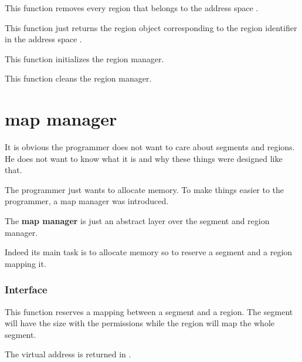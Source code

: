 	 {
	   This function removes every region that belongs to the
	   address space .
	 }

	 {
	   This function just returns the region object
	   corresponding to the region identifier  in the
	   address space .
	 }

	 {
	   This function initializes the region manager.
	 }

	 {
	   This function cleans the region manager.
	 }

%
%

\section{map manager}

It is obvious the programmer does not want to care about segments and
regions. He does not want to know what it is and why these things were
designed like that.

The programmer just wants to allocate memory. To make things easier
to the programmer, a map manager was introduced.

The \textbf{map manager} is just an abstract layer over the segment
and region manager.

Indeed its main task is to allocate memory so to reserve a segment
and a region mapping it.

%
%

\subsubsection{Interface}

	 {
	   This function reserves a mapping between a segment and a region.
	   The segment will have the size  with the permissions
	    while the region will map the whole segment.

	   The virtual address is returned in .

	 }

